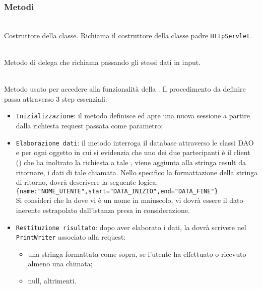 \subsubsection*{Metodi}
\begin{description}
	\item{}\\
	Costruttore della classe. Richiama il costruttore della classe padre \texttt{HttpServlet}.
	
	\item{}\\
	Metodo di delega che richiama  passando gli stessi dati in input.
	
	\item{}\\
	Metodo usato per accedere alla funzionalità della . Il procedimento da definire passa attraverso 3 step essenziali:
	\begin{itemize}
		\item \texttt{Inizializzazione}: il metodo definisce ed apre una nuova sessione a partire dalla richiesta request passata come parametro;
		\item \texttt{Elaborazione dati}: il metodo interroga il database attraverso le classi DAO e per ogni oggetto  in cui si evidenzia che uno dei due partecipanti è il client () che ha inoltrato la richiesta a tale , viene aggiunta alla stringa result da ritornare, i dati di tale chiamata. Nello specifico la formattazione della stringa di ritorno, dovrà descrivere la seguente logica:\\
		
		\verb|{name:"NOME_UTENTE",start="DATA_INIZIO",end="DATA_FINE"}|\\
		
		Si consideri che la dove vi è un nome in maiuscolo, vi dovrà essere il dato inerente estrapolato dall'istanza  presa in considerazione.
		\item \texttt{Restituzione risultato}: dopo aver elaborato i dati, la  dovrà scrivere nel \texttt{PrintWriter} associato alla request:
			\begin{itemize}
				\item una stringa formattata come sopra, se l'utente ha effettuato o ricevuto almeno una chimata;
				\item null, altrimenti.
			\end{itemize}
	\end{itemize}

\end{description}

